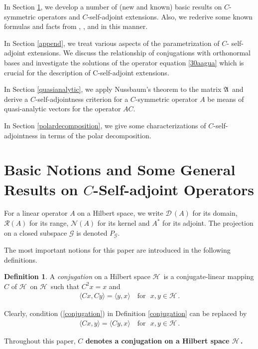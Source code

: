 \documentclass[12pt]{amsart}
\newcommand{\cR}{\mathcal{R}}
\theoremstyle{definition}
\newtheorem{defn}[thm]{Definition}
\newcommand{\gA}{\mathfrak{A}\,}
\newcommand{\cD}{\mathcal{D}\,}
\newcommand{\cH}{\mathcal{H}\,}
\newcommand{\cN}{\mathcal{N}}
\newcommand{\cG}{\mathcal{G}}
\begin{document}
In Section \ref{basic}, we develop a number of (new and known) basic results on $C$-symmetric operators and $C$-self-adjoint  extensions. Also, we rederive some known formulas and facts from \cite{galindo}, \cite{knowles80}, \cite{knowles} and \cite{race} in this manner.

In Section \ref{append}, we treat various aspects of the parametrization of $C$- self-adjoint extensions. We discuss the  relationship of conjugations with  orthonormal bases and investigate the solutions of the operator equation \eqref{30aagua} which is crucial for the description of C-self-adjoint extensions.

In Section \ref{quasianalytic}, we apply Nussbaum's theorem \cite{nussbaum} to the matrix $\gA$ and derive a $C$-self-adjointness criterion for a $C$-symmetric operator $A$ be means of quasi-analytic vectors for the operator $AC$.

 In Section \ref{polardecomposition}, we give some characterizations of $C$-self-adjointness in terms of the polar decomposition.




\section{Basic Notions and Some General Results on $C$-Self-adjoint Operators}\label{basic}

For a linear operator $A$ on a Hilbert space, we write $\cD(A)$ for its domain, $\cR(A)$ for its range, $\cN(A)$ for its kernel and  $A^*$ for its adjoint. The projection on a closed subspace $\cG$ is denoted  $P_\cG$.

The most important notions for this paper are introduced in the following definitions.

\begin{defn} A \emph{conjugation} on a Hilbert space $\cH$ is a conjugate-linear mapping $C$ of $\cH$ on $\cH$ such that $C^2x=x$  and
\begin{align}\label{conjugation}
\langle Cx,Cy\rangle =\langle y,x\rangle \quad \textrm{for}~~~x,y\in \cH.
\end{align}
\end{defn}
Clearly, condition (\ref{conjugation}) in Definition \ref{conjugation} can be replaced by
\begin{align*}
 \langle Cx,y\rangle =\langle Cy,x\rangle \quad \textrm{for}~~~x,y\in \cH.
\end{align*}

Throughout this paper,  {\bf$C$ denotes a conjugation on a Hilbert space $\cH$. }
\end{document}
